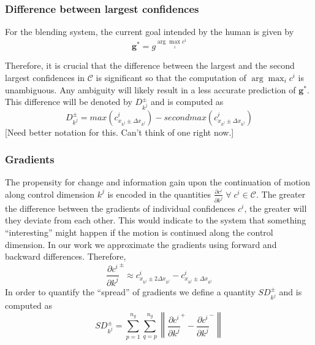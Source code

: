 \documentclass[conference]{IEEEtran}
\newcommand{\argmax}{\arg\!\max}
\newcommand{\norm}[1]{\left\lVert#1\right\rVert}
\begin{document}
\subsubsection{Difference between largest confidences}
For the blending system, the current goal intended by the human is given by 
\begin{equation*}
\boldsymbol{g}^{*} = g^{\argmax_i c^i}
\end{equation*}

Therefore, it is crucial that the difference between the largest and the second largest confidences in $\mathcal{C}$ is significant so that the computation of $\argmax_i c^i$ is unambiguous. Any ambiguity will likely result in a less accurate prediction of $\boldsymbol{g}^*$. This difference will be denoted by $D^{\pm}_{k^j}$ and is computed as
\begin{equation*}
D^{\pm}_{k^j} = max(c^{i}_{x_{k^j}\pm\Delta x_{k^j}}) - secondmax(c^{i}_{x_{k^j}\pm\Delta x_{k^j}})
\end{equation*}
[Need better notation for this. Can't think of one right now.]
\subsubsection{Gradients}
The propensity for change and information gain upon the continuation of motion along control dimension $k^j$ is encoded in the quantities $\frac{\partial c^i}{\partial k^j}\; \forall\; c^i\in \mathcal{C}$. The greater the difference between the gradients of individual confidences $c^i$, the greater will they deviate from each other. This would indicate to the system that something ``interesting'' might happen if the motion is continued along the control dimension. In our work we approximate the gradients using forward and backward differences. Therefore, 
\begin{equation*}
\frac{\partial c^i}{\partial k^j}^{\pm} \approx c^{i}_{x_{k^j} \pm 2\Delta x_{k^j}} - c^{i}_{x_{k^j} \pm \Delta x_{k^j}} 
\end{equation*}
In order to quantify the ``spread'' of gradients we define a quantity $SD^{\pm}_{k^j}$ and is computed as 
\begin{equation*}
SD^{\pm}_{k^j} = \sum_{p=1}^{n_g}\sum_{q=p}^{n_g}\norm{\frac{\partial c^i}{\partial k^j}^{+} - \frac{\partial c^i}{\partial k^j}^{-}}
\end{equation*}
\end{document}
